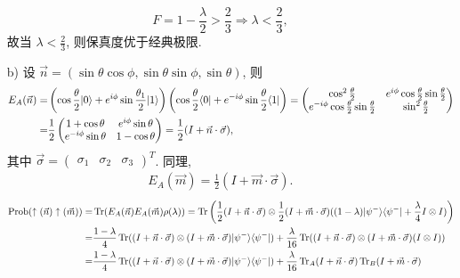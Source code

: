 \documentclass{assignment}
\begin{document}
\begin{sol}
\begin{itemize}
        \[
            F=1-\frac{\lambda}{2}>\frac{2}{3}\Longrightarrow\lambda<\frac{2}{3},
        \]
        故当 $\lambda<\frac{2}{3}$, 则保真度优于经典极限.
        \item[b)] 设 $\vec{n}=(\sin\theta\cos\phi,\sin\theta\sin\phi,\sin\theta)$, 则
        \begin{align}
            \notag E_A(\vec{n})=&\left(\cos\frac{\theta}{2}\lvert 0\rangle+e^{i\phi}\sin\frac{\theta_1}{2}\lvert 1\rangle\right)\left(\cos\frac{\theta}{2}\langle 0\rvert+e^{-i\phi}\sin\frac{\theta}{2}\langle 1\rvert\right)=\begin{pmatrix}
                \cos^2\frac{\theta}{2}&e^{i\phi}\cos\frac{\theta}{2}\sin\frac{\theta}{2}\\
                e^{-i\phi}\cos\frac{\theta}{2}\sin\frac{\theta}{2}&\sin^2\frac{\theta}{2}
            \end{pmatrix}\\
            =&\frac{1}{2}\begin{pmatrix}
                1+\cos\theta&e^{i\phi}\sin\theta\\
                e^{-i\phi}\sin\theta&1-\cos\theta
            \end{pmatrix}=\frac{1}{2}(I+\vec{n}\cdot\vec{\sigma}),
        \end{align}
        其中 $\vec{\sigma}=\begin{pmatrix}
            \sigma_1&\sigma_2&\sigma_3
        \end{pmatrix}^T$.
        同理,
        \begin{align}
            E_A(\vec{m})=\frac{1}{2}(I+\vec{m}\cdot\vec{\sigma}).
        \end{align}
        \begin{align}
            \notag\text{Prob}(\uparrow(\vec{n})\uparrow(\vec{m}))=&\tr(E_A(\vec{n})E_A(\vec{m})\rho(\lambda))=\tr\left(\frac{1}{2}(I+\vec{n}\cdot\vec{\sigma})\otimes\frac{1}{2}(I+\vec{m}\cdot\vec{\sigma})((1-\lambda)\lvert\psi^-\rangle\langle\psi^-\rvert+\frac{\lambda}{4}I\otimes I)\right)\\
            \notag=&\frac{1-\lambda}{4}\tr((I+\vec{n}\cdot\vec{\sigma})\otimes(I+\vec{m}\cdot\vec{\sigma})\lvert\psi^-\rangle\langle\psi^-\rvert)+\frac{\lambda}{16}\tr((I+\vec{n}\cdot\vec{\sigma})\otimes(I+\vec{m}\cdot\vec{\sigma})(I\otimes I))\\
            \notag=&\frac{1-\lambda}{4}\tr((I+\vec{n}\cdot\vec{\sigma})\otimes(I+\vec{m}\cdot\vec{\sigma})\lvert\psi^-\rangle\langle\psi^-\rvert)+\frac{\lambda}{16}\tr_A(I+\vec{n}\cdot\vec{\sigma})\tr_B(I+\vec{m}\cdot\vec{\sigma})\\

\end{align}
\end{itemize}
\end{sol}
\end{document}
